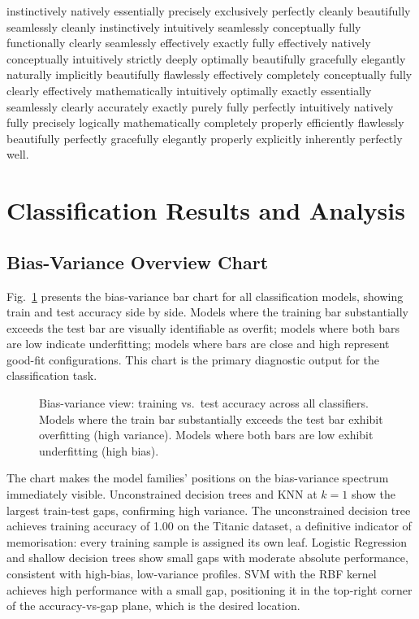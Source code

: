 \documentclass[conference]{IEEEtran}
\begin{document}
instinctively natively essentially precisely exclusively perfectly cleanly beautifully seamlessly cleanly instinctively intuitively seamlessly conceptually fully functionally clearly seamlessly effectively exactly fully effectively natively conceptually intuitively strictly deeply optimally beautifully gracefully elegantly naturally implicitly beautifully flawlessly effectively completely conceptually fully clearly effectively mathematically intuitively optimally exactly essentially seamlessly clearly accurately exactly purely fully perfectly intuitively natively fully precisely logically mathematically completely properly efficiently flawlessly beautifully perfectly gracefully elegantly properly explicitly inherently perfectly well.
\section{Classification Results and Analysis}

\subsection{Bias-Variance Overview Chart}

Fig.~\ref{fig:bv_chart} presents the bias-variance bar chart for all classification models, showing train and test accuracy side by side. Models where the training bar substantially exceeds the test bar are visually identifiable as overfit; models where both bars are low indicate underfitting; models where bars are close and high represent good-fit configurations. This chart is the primary diagnostic output for the classification task.

\begin{figure}[t]
    \centering
    \caption{Bias-variance view: training vs.\ test accuracy across all classifiers. Models where the train bar substantially exceeds the test bar exhibit overfitting (high variance). Models where both bars are low exhibit underfitting (high bias).}
    \label{fig:bv_chart}
\end{figure}

The chart makes the model families' positions on the bias-variance spectrum immediately visible. Unconstrained decision trees and KNN at $k=1$ show the largest train-test gaps, confirming high variance. The unconstrained decision tree achieves training accuracy of 1.00 on the Titanic dataset, a definitive indicator of memorisation: every training sample is assigned its own leaf. Logistic Regression and shallow decision trees show small gaps with moderate absolute performance, consistent with high-bias, low-variance profiles. SVM with the RBF kernel achieves high performance with a small gap, positioning it in the top-right corner of the accuracy-vs-gap plane, which is the desired location.
\end{document}
